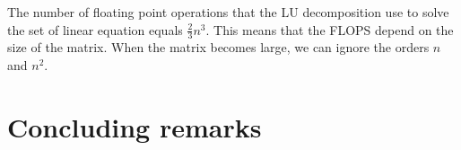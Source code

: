 \documentclass[norsk,a4paper,12pt]{article}
\begin{document}
The number of floating point operations that the LU decomposition use to solve the set of linear equation equals $\frac{2}{3} n^3$. This means that the FLOPS depend on the size of the matrix. When the matrix becomes large, we can ignore the orders $n$ and $n^2$.        

  
\section{Concluding remarks}





\end{document}
